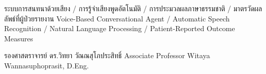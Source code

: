 \keywords
{ระบบการสนทนาด้วยเสียง / การรู้จำเสียงพูดอัตโนมัติ / การประมวลผลภาษาธรรมชาติ / มาตรวัดผลลัพธ์ที่ผู้ป่วยรายงาน}
{Voice-Based Conversational Agent / Automatic Speech Recognition / Natural Language Processing / Patient-Reported Outcome Measures}

\deanname
{รองศาสตราจารย์ ดร.วิทยา วัณณสุโภประสิทธิ์}
{Associate Professor Witaya Wannasuphoprasit, D.Eng.}

\committee
{

    \CommitteeBlockAdvisor
    \CommitteeBlockCoAdvisor





}
